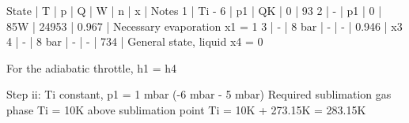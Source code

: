 State | T | p | Q | W | n | x | Notes  
1 | Ti - 6 | p1 | QK | 0 | 93%
2 | - | p1 | 0 | 85W | 24953 | 0.967 | Necessary evaporation x1 = 1  
3 | - | 8 bar | - | - | 0.946 | x3  
4 | - | 8 bar | - | - | 734 | General state, liquid x4 = 0  

For the adiabatic throttle, h1 = h4  

Step ii:  
Ti constant, p1 = 1 mbar (-6 mbar - 5 mbar)  
Required sublimation gas phase  
Ti = 10K above sublimation point  
Ti = 10K + 273.15K = 283.15K